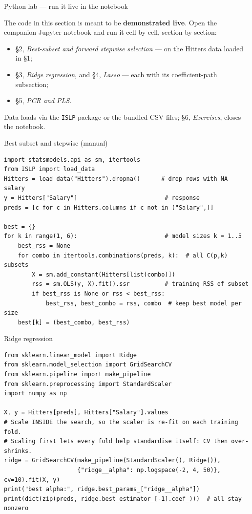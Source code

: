 \documentclass[aspectratio=169,11pt]{beamer}
\begin{document}
\begin{frame}{Python lab --- run it live in the notebook}
  \begin{labnote}
    The code in this section is meant to be \textbf{demonstrated live}. Open the companion Jupyter notebook and run it cell by cell, section by section:
    \begin{itemize}
      \item \S2, \emph{Best-subset and forward stepwise selection} --- on the Hitters data loaded in \S1;
      \item \S3, \emph{Ridge regression}, and \S4, \emph{Lasso} --- each with its coefficient-path subsection;
      \item \S5, \emph{PCR and PLS}.
    \end{itemize}
    Data loads via the \texttt{ISLP} package or the bundled CSV files; \S6, \emph{Exercises}, closes the notebook.
  \end{labnote}
\end{frame}



\begin{frame}[fragile]{Best subset and stepwise (manual)}
  \begin{lstlisting}
import statsmodels.api as sm, itertools
from ISLP import load_data
Hitters = load_data("Hitters").dropna()      # drop rows with NA salary
y = Hitters["Salary"]                         # response
preds = [c for c in Hitters.columns if c not in ("Salary",)]

best = {}
for k in range(1, 6):                         # model sizes k = 1..5
    best_rss = None
    for combo in itertools.combinations(preds, k):  # all C(p,k) subsets
        X = sm.add_constant(Hitters[list(combo)])
        rss = sm.OLS(y, X).fit().ssr          # training RSS of subset
        if best_rss is None or rss < best_rss:
            best_rss, best_combo = rss, combo  # keep best model per size
    best[k] = (best_combo, best_rss)
  \end{lstlisting}
\end{frame}

\begin{frame}[fragile]{Ridge regression}
  \begin{lstlisting}
from sklearn.linear_model import Ridge
from sklearn.model_selection import GridSearchCV
from sklearn.pipeline import make_pipeline
from sklearn.preprocessing import StandardScaler
import numpy as np

X, y = Hitters[preds], Hitters["Salary"].values
# Scale INSIDE the search, so the scaler is re-fit on each training fold.
# Scaling first lets every fold help standardise itself: CV then over-shrinks.
ridge = GridSearchCV(make_pipeline(StandardScaler(), Ridge()),
                     {"ridge__alpha": np.logspace(-2, 4, 50)}, cv=10).fit(X, y)
print("best alpha:", ridge.best_params_["ridge__alpha"])
print(dict(zip(preds, ridge.best_estimator_[-1].coef_)))  # all stay nonzero
  \end{lstlisting}
\end{frame}
\end{document}
